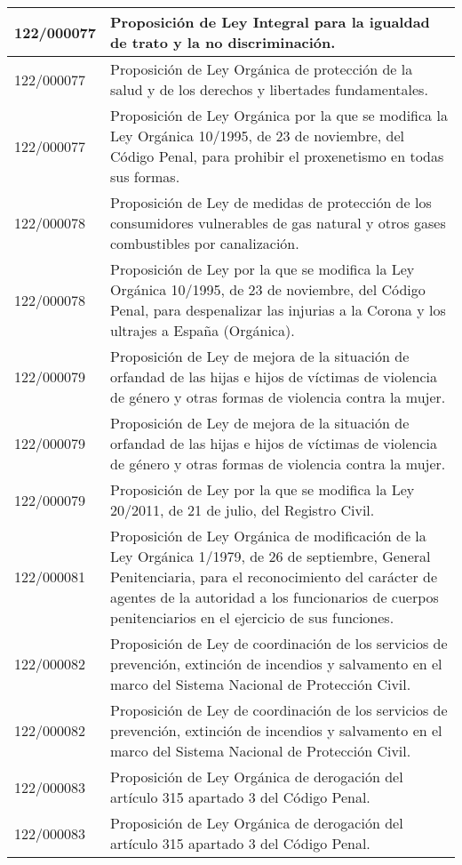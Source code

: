 {\begin{table}[H]
\begin{center}
\begin{tabularx}{\linewidth}{| l | X |}
\hline
122/000077 & Proposición de Ley Integral para la igualdad de trato y la no discriminación. \\
\hline
122/000077 & Proposición de Ley Orgánica de protección de la salud y de los derechos y libertades fundamentales. \\
\hline
122/000077 & Proposición de Ley Orgánica por la que se modifica la Ley Orgánica 10/1995, de 23 de noviembre, del Código Penal, para prohibir el proxenetismo en todas sus formas. \\
\hline
122/000078 & Proposición de Ley de medidas de protección de los consumidores vulnerables de gas natural y otros gases combustibles por canalización. \\
\hline
122/000078 & Proposición de Ley por la que se modifica la Ley Orgánica 10/1995, de 23 de noviembre, del Código Penal, para despenalizar las injurias a la Corona y los ultrajes a España (Orgánica). \\
\hline
122/000079 & Proposición de Ley de mejora de la situación de orfandad de las hijas e hijos de víctimas de violencia de género y otras formas de violencia contra la mujer. \\
\hline
122/000079 & Proposición de Ley de mejora de la situación de orfandad de las hijas e hijos de víctimas de violencia de género y otras formas de violencia contra la mujer. \\
\hline
122/000079 & Proposición de Ley por la que se modifica la Ley 20/2011, de 21 de julio, del Registro Civil. \\
\hline
122/000081 & Proposición de Ley Orgánica de modificación de la Ley Orgánica 1/1979, de 26 de septiembre, General Penitenciaria, para el reconocimiento del carácter de agentes de la autoridad a los funcionarios de cuerpos penitenciarios en el ejercicio de sus funciones. \\
\hline
122/000082 & Proposición de Ley de coordinación de los servicios de prevención, extinción de incendios y salvamento en el marco del Sistema Nacional de Protección Civil. \\
\hline
122/000082 & Proposición de Ley de coordinación de los servicios de prevención, extinción de incendios y salvamento en el marco del Sistema Nacional de Protección Civil. \\
\hline
122/000083 & Proposición de Ley Orgánica de derogación del artículo 315 apartado 3 del Código Penal. \\
\hline
122/000083 & Proposición de Ley Orgánica de derogación del artículo 315 apartado 3 del Código Penal. \\

\end{tabularx}
\end{center}
\end{table}}
